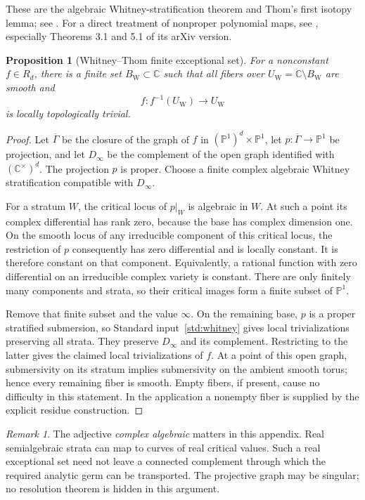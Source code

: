 \documentclass[11pt]{article}
\numberwithin{equation}{section}
\newtheorem{proposition}[theorem]{Proposition}
\theoremstyle{definition}
\theoremstyle{remark}
\newtheorem{remark}[theorem]{Remark}
\newcommand{\C}{\mathbb C}
\newcommand{\Pj}{\mathbb P}
\newcommand{\torus}{(\C^\times)^d}
\begin{document}
These are the algebraic Whitney-stratification theorem and Thom's first
isotopy lemma; see \cite{Kaloshin,Mather}. For a direct treatment of
nonproper polynomial maps, see \cite{DJ}, especially Theorems 3.1 and
5.1 of its arXiv version.

\begin{proposition}[Whitney--Thom finite exceptional set]\label{prop:bifurcation-whitney}
For a nonconstant $f\in R_d$, there is a finite set $B_{\mathrm W}\subset\C$
such that all fibers over $U_{\mathrm W}=\C\setminus B_{\mathrm W}$ are
smooth and
\[
 f:f^{-1}(U_{\mathrm W})\longrightarrow U_{\mathrm W}
\]
is locally topologically trivial.
\end{proposition}
\begin{proof}
Let $\overline\Gamma$ be the closure of the graph of $f$ in
$(\Pj^1)^d\times\Pj^1$, let $p:\overline\Gamma\to\Pj^1$ be projection,
and let $D_\infty$ be the complement of the open graph identified with
$\torus$. The projection $p$ is proper. Choose a finite complex
algebraic Whitney stratification compatible with $D_\infty$.

For a stratum $W$, the critical locus of $p|_W$ is algebraic in $W$.
At such a point its complex differential has rank zero, because the
base has complex dimension one. On the smooth locus of any irreducible
component of this critical locus, the restriction of $p$ consequently
has zero differential and is locally constant. It is therefore constant
on that component. Equivalently, a rational function with zero
differential on an irreducible complex variety is constant. There are
only finitely many components and strata, so their critical images form
a finite subset of $\Pj^1$.

Remove that finite subset and the value $\infty$. On the remaining base,
$p$ is a proper stratified submersion, so Standard
input~\ref{std:whitney} gives local trivializations preserving all strata.
They preserve $D_\infty$ and its complement. Restricting to the latter
gives the claimed local trivializations of $f$. At a point of this open
graph, submersivity on its stratum implies submersivity on the ambient
smooth torus; hence every remaining fiber is smooth. Empty fibers, if
present, cause no difficulty in this statement. In the application a
nonempty fiber is supplied by the explicit residue construction.
\end{proof}

\begin{remark}
The adjective \emph{complex algebraic} matters in this appendix. Real
semialgebraic strata can map to curves of real critical values. Such a
real exceptional set need not leave a connected complement through which
the required analytic germ can be transported. The projective graph may
be singular; no resolution theorem is hidden in this argument.
\end{remark}
\end{document}
